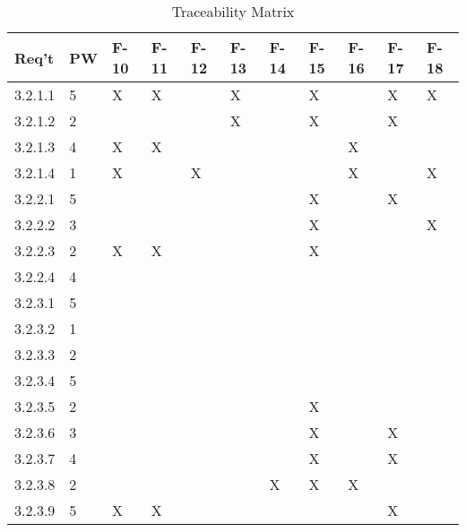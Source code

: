 \documentclass[12pt, titlepage]{article}
\begin{document}
	\begin{table}[h!]
    \caption{Traceability Matrix}
    \begin{center}
	\begin{tabular}{|p{1.5cm}|p{1.0cm}|p{1.0cm}p{1.0cm}p{1.0cm}p{1.0cm}p{1.0cm}p{1.0cm}p{1.0cm}p{1.0cm}p{1.0cm}|}
	\hline
	\textbf{Req't} & \textbf{PW} & \textbf{F-10} & \textbf{F-11} & \textbf{F-12} & \textbf{F-13} & \textbf{F-14} & \textbf{F-15} & \textbf{F-16} & \textbf{F-17} & \textbf{F-18}\\
	\hline
	\hline
      3.2.1.1 & 5 & X & X &  & X &  & X & &X&X\\
      3.2.1.2 & 2 &   & &   &X & &    X& &X&\\
      3.2.1.3 &4  & X &X &  & && & X &  &\\
      3.2.1.4 &1& X  & & X  & & &    & X &  &X\\
      3.2.2.1 &5&   & &   & & & X   & &X&\\
      3.2.2.2 &3&&&&&&X&&&X\\
      3.2.2.3 &2&X&X&&&&X&&&\\
      3.2.2.4 &4&&&&&&&&&\\
      3.2.3.1 &5&&&&&&&&&\\
      3.2.3.2 &1&&&&&&&&&\\
      3.2.3.3 &2&&&&&&&&&\\
      3.2.3.4 &5&&&&&&&&&\\
      3.2.3.5 &2&&&&&&X&&&\\
      3.2.3.6 &3&&&&&&X&&X&\\
      3.2.3.7 &4&&&&&&X&&X&\\
      3.2.3.8 &2&&&&&X&X&X&&\\
      3.2.3.9 &5&X&X&&&&&&X&\\
      \hline
	\end{tabular}
    \end{center}
	\end{table}
	\newpage
	
\end{document}
